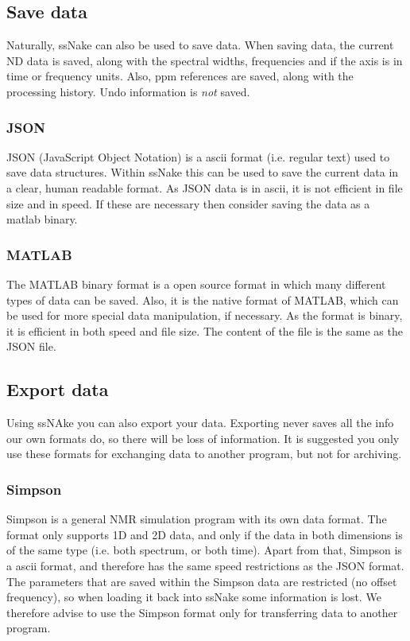 \documentclass[11pt,a4paper]{article}
\begin{document}
\subsection{Save data}
Naturally, ssNake can also be used to save data. When saving data, the current ND data is saved, along with the spectral widths, frequencies and if the axis is in time or frequency units. Also, ppm references are saved, along with the processing history. Undo information is \textit{not} saved.

\subsubsection*{JSON}
JSON (JavaScript Object Notation) is a ascii format (i.e. regular text) used to save data structures. Within ssNake this can be used to save the current data in a clear, human readable format. As JSON data is in ascii, it is not efficient in file size and in speed. If these are necessary then consider saving the data as a matlab binary.

\subsubsection*{MATLAB}
The MATLAB binary format is a open source format in which many different types of data can be saved. Also, it is the native format of MATLAB, which can be used for more special data manipulation, if necessary. As the format is binary, it is efficient in both speed and file size. The content of the file is the same as the JSON file.


\subsection{Export data}
Using ssNAke you can also export your data. Exporting never saves all the info our own formats do, so there will be loss of information. It is suggested you only use these formats for exchanging data to another program, but not for archiving.


\subsubsection*{Simpson}
Simpson is a general NMR simulation program with its own data format. The format only supports 1D and 2D data, and only if the data in both dimensions is of the same type (i.e. both spectrum, or both time). Apart from that, Simpson is a ascii format, and therefore has the same speed restrictions as the JSON format. The parameters that are saved within the Simpson data are restricted (no offset frequency), so when loading it back into ssNake some information is lost. We therefore advise to use the Simpson format only for transferring data to another program.
\end{document}
